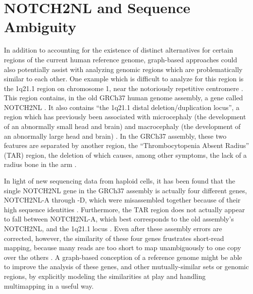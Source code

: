 \documentclass[11pt,proposal]{ucthesis}
\begin{document}
    

\section{NOTCH2NL and Sequence Ambiguity}
    
In addition to accounting for the existence of distinct alternatives for certain regions of the current human reference genome, graph-based approaches could also potentially assist with analyzing genomic regions which are problematically similar to each other. One example which is difficult to analyze for this region is the 1q21.1 region on chromosome 1, near the notoriously repetitive centromere \cite{jacobs2014recently}. This region contains, in the old GRCh37 human genome assembly, a gene called NOTCH2NL \cite{jacobs2014recently}. It also contains ``the 1q21.1 distal deletion/duplication locus'', a region which has previously been associated with microcephaly (the development of an abnormally small head and brain) and macrocephaly (the development of an abnormally large head and brain) \cite{jacobs2014recently}. In the GRCh37 assembly, these two features are separated by another region, the ``Thrombocytopenia Absent Radius'' (TAR) region, the deletion of which causes, among other symptoms, the lack of a radius bone in the arm \cite{jacobs2014recently}.

In light of new sequencing data from haploid cells, it has been found that the single NOTCH2NL gene in the GRCh37 assembly is actually four different genes, NOTCH2NL-A through -D, which were misassembled together because of their high sequence identities \cite{jacobs2014recently}. Furthermore, the TAR region does not actually appear to fall between NOTCH2NL-A, which best corresponds to the old assembly's NOTCH2NL, and the 1q21.1 locus \cite{jacobs2014recently}. Even after these assembly errors are corrected, however, the similarity of these four genes frustrates short-read mapping, because many reads are too short to map unambiguously to one copy over the others \cite{jacobs2014recently}. A graph-based conception of a reference genome might be able to improve the analysis of these genes, and other mutually-similar sets or genomic regions, by explicitly modeling the similarities at play and handling multimapping in a useful way.
    
\end{document}
